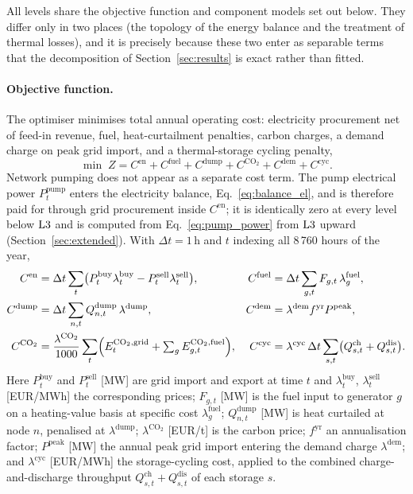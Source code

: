 
All levels share the objective function and component models set out below. They differ
only in two places (the topology of the energy balance and the treatment of thermal
losses), and it is precisely because these two enter as separable terms that the
decomposition of Section~\ref{sec:results} is exact rather than fitted.

\paragraph{Objective function.}
The optimiser minimises total annual operating cost: electricity procurement net of
feed-in revenue, fuel, heat-curtailment penalties, carbon charges, a demand charge on
peak grid import, and a thermal-storage cycling penalty,
\begin{equation}
  \min \; Z = C^{\mathrm{en}} + C^{\mathrm{fuel}}
    + C^{\mathrm{dump}} + C^{\mathrm{CO_2}} + C^{\mathrm{dem}}
    + C^{\mathrm{cyc}} .
  \label{eq:objective}
\end{equation}
Network pumping does not appear as a separate cost term. The pump electrical power
$P_t^{\mathrm{pump}}$ enters the electricity balance, Eq.~\eqref{eq:balance_el}, and is
therefore paid for through grid procurement inside $C^{\mathrm{en}}$; it is identically
zero at every level below $\mathrm{L3}$ and is computed from Eq.~\eqref{eq:pump_power} from
$\mathrm{L3}$ upward (Section~\ref{sec:extended}). With $\Delta t = 1$\,h and $t$ indexing all
8\,760 hours of the year,
\begin{align*}
C^{\mathrm{en}}   &= \Delta t \sum_t
  \bigl(P_t^{\mathrm{buy}} \lambda_t^{\mathrm{buy}}
        - P_t^{\mathrm{sell}} \lambda_t^{\mathrm{sell}}\bigr), &
C^{\mathrm{fuel}} &= \Delta t \sum_{g,t}
  F_{g,t}\, \lambda_g^{\mathrm{fuel}}, \\
C^{\mathrm{dump}} &= \Delta t \sum_{n,t}
  Q_{n,t}^{\mathrm{dump}}\, \lambda^{\mathrm{dump}}, &
C^{\mathrm{dem}}  &= \lambda^{\mathrm{dem}} f^{\mathrm{yr}}
  P^{\mathrm{peak}}, \\
C^{\mathrm{CO_2}} &= \frac{\lambda^{\mathrm{CO_2}}}{1000} \sum_t
  \Bigl(E_t^{\mathrm{CO_2,grid}} +
        \textstyle\sum_g E_{g,t}^{\mathrm{CO_2,fuel}}\Bigr), &
C^{\mathrm{cyc}} &= \lambda^{\mathrm{cyc}}\,\Delta t \sum_{s,t}
  \bigl(Q_{s,t}^{\mathrm{ch}} + Q_{s,t}^{\mathrm{dis}}\bigr).
\end{align*}
Here $P_t^{\mathrm{buy}}$ and $P_t^{\mathrm{sell}}$ [MW] are grid import and export at
time $t$ and $\lambda_t^{\mathrm{buy}}$, $\lambda_t^{\mathrm{sell}}$ [EUR/MWh] the
corresponding prices; $F_{g,t}$ [MW] is the fuel input to generator $g$ on a
heating-value basis at specific cost $\lambda_g^{\mathrm{fuel}}$;
$Q_{n,t}^{\mathrm{dump}}$ [MW] is heat curtailed at node $n$, penalised at
$\lambda^{\mathrm{dump}}$; $\lambda^{\mathrm{CO_2}}$ [EUR/t] is the carbon price;
$f^{\mathrm{yr}}$ an annualisation factor; $P^{\mathrm{peak}}$ [MW] the annual peak
grid import entering the demand charge $\lambda^{\mathrm{dem}}$; and
$\lambda^{\mathrm{cyc}}$ [EUR/MWh] the storage-cycling cost, applied to the combined
charge-and-discharge throughput $Q_{s,t}^{\mathrm{ch}}+Q_{s,t}^{\mathrm{dis}}$ of each
storage $s$.


